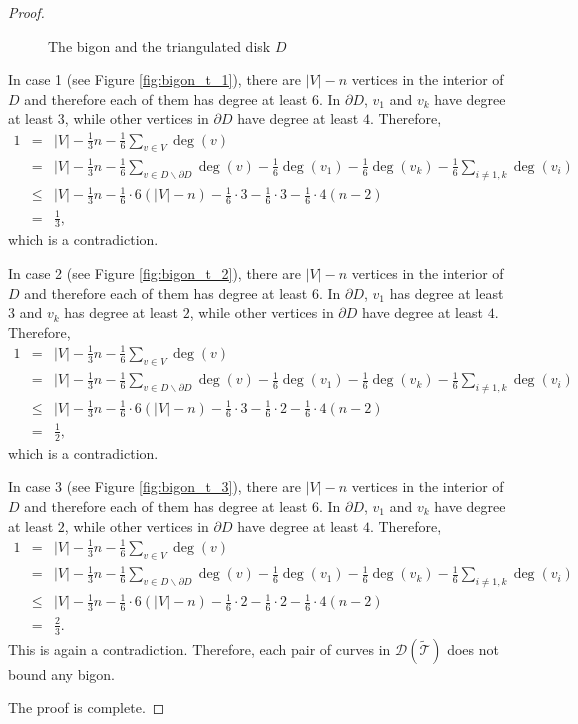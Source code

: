 \documentclass[UTF8]{amsart}
\numberwithin{equation}{section}
\theoremstyle{definition}
\theoremstyle{example}
\theoremstyle{remark}
\begin{document}
\begin{proof}
\begin{figure}[htbp]
	\caption{The bigon and the triangulated disk $D$}
	\label{fig:bigon_t}
\end{figure}	
In case 1 (see Figure \ref{fig:bigon_t_1}), there are $|V| -n$ vertices in the interior of $D$ and therefore each of them has degree at least $6$. In $ \partial D$, 
$v_1$ and $v_k$ have degree at least $3$, while other vertices in $\partial D$ have degree at least $4$. Therefore,
	\begin{eqnarray*}
		1 &=& |V| - \frac{1}{3} n - \frac{1}{6}\sum_{v\in V} \deg(v) \\
		  &=&|V| - \frac{1}{3} n  - \frac{1}{6}  \sum_{v\in D \backslash\partial D} \deg(v) - \frac{1}{6}\deg(v_1) - \frac{1}{6}\deg(v_k)- \frac{1}{6}\sum_{i\ne 1,k} \deg(v_i)  \\
		  & \le & |V| - \frac{1}{3} n  - \frac{1}{6}\cdot 6(|V| - n) - \frac{1}{6} \cdot3- \frac{1}{6} \cdot3- \frac{1}{6} \cdot4(n-2)  \\
		  &=& \frac{1}{3}, 
	\end{eqnarray*}
	which is a contradiction. 

	In case 2 (see Figure \ref{fig:bigon_t_2}), there are $|V| -n$ vertices in the interior of $D$ and therefore each of them has degree at least $6$. In $ \partial D$, 
$v_1$ has degree at least $3$ and $v_k$ has degree at least $2$, while other vertices in $\partial D$ have degree at least $4$. Therefore,
	\begin{eqnarray*}
		1 &=& |V| - \frac{1}{3} n - \frac{1}{6}\sum_{v\in V} \deg(v) \\
		  &=&|V| - \frac{1}{3} n  - \frac{1}{6}  \sum_{v\in D \backslash\partial D} \deg(v) - \frac{1}{6}\deg(v_1) - \frac{1}{6}\deg(v_k)- \frac{1}{6}\sum_{i\ne 1,k} \deg(v_i)  \\
		  & \le & |V| - \frac{1}{3} n  - \frac{1}{6}\cdot 6(|V| - n) - \frac{1}{6} \cdot3 - \frac{1}{6} \cdot2 - \frac{1}{6} \cdot4(n-2)  \\
		  &=& \frac{1}{2}, 
	\end{eqnarray*}
	which is a contradiction. 

	In case 3 (see Figure \ref{fig:bigon_t_3}), there are $|V| -n$ vertices in the interior of $D$ and therefore each of them has degree at least $6$. In $ \partial D$, 
$v_1$ and $v_k$ have degree at least $2$, while other vertices in $\partial D$ have degree at least $4$. Therefore,
	\begin{eqnarray*}
		1 &=& |V| - \frac{1}{3} n - \frac{1}{6}\sum_{v\in V} \deg(v) \\
		  &=&|V| - \frac{1}{3} n  - \frac{1}{6}  \sum_{v\in D \backslash\partial D} \deg(v) - \frac{1}{6}\deg(v_1) - \frac{1}{6}\deg(v_k)- \frac{1}{6}\sum_{i\ne 1,k} \deg(v_i)  \\
		  & \le & |V| - \frac{1}{3} n  - \frac{1}{6}\cdot 6(|V| - n) - \frac{1}{6} \cdot2- \frac{1}{6} \cdot2- \frac{1}{6} \cdot4(n-2)  \\
		  &=& \frac{2}{3}. 
	\end{eqnarray*}
	This is again a contradiction. Therefore, each pair of curves in $\mathcal{D}( \widetilde{\mathcal{T}})$ does not bound any bigon. 

	The proof is complete. 
\end{proof}
\end{document}
